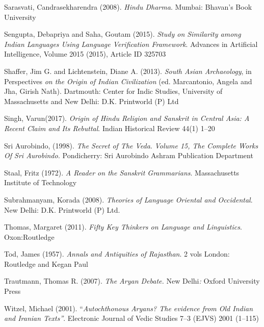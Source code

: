\begin{thebibliography}{99}
  Sarasvati, Candrasekharendra (2008). \textit{Hindu Dharma}. Mumbai: Bhavan’s Book University 

  Sengupta, Debapriya and Saha, Goutam (2015). \textit{Study on Similarity among Indian Languages Using Language Verification Framework}. Advances in Artificial Intelligence, Volume 2015 (2015), Article ID 325703

  Shaffer, Jim G. and Lichtenstein, Diane A. (2013). \textit{South Asian Archaeology}, in Perspectives \textit{on the Origin of Indian Civilization} (ed. Marcantonio, Angela and Jha, Girish Nath). Dartmouth: Center for Indic Studies, University of Massachusetts and New Delhi: D.K. Printworld (P) Ltd

  Singh, Varun(2017). \textit{Origin of Hindu Religion and Sanskrit in Central Asia: A Recent Claim and Its Rebuttal}. Indian Historical Review 44(1) 1–20

  Sri Aurobindo, (1998). \textit{The Secret of The Veda}. \textit{Volume 15, The Complete Works Of Sri Aurobindo.} Pondicherry: Sri Aurobindo Ashram Publication Department

  Staal, Fritz (1972). \textit{A Reader on the Sanskrit Grammarians}. Massachusetts Institute of Technology

  Subrahmanyam, Korada (2008). \textit{Theories of Language Oriental and Occidental}. New Delhi: D.K. Printworld (P) Ltd. 

  Thomas, Margaret (2011). \textit{Fifty Key Thinkers on Language and Linguistics}. Oxon:Routledge

  Tod, James (1957). \textit{Annals and Antiquities of Rajasthan}. 2 vols London: Routledge and Kegan Paul

  Trautmann, Thomas R. (2007). \textit{The Aryan Debate.} New Delhi\textit{: }Oxford University Press

  Witzel, Michael (2001). “\textit{Autochthonous Aryans? The evidence from Old Indian and Iranian Texts”}. Electronic Journal of Vedic Studies 7–3 (EJVS) 2001 (1–115)

 \end{thebibliography}

\theendnotes

